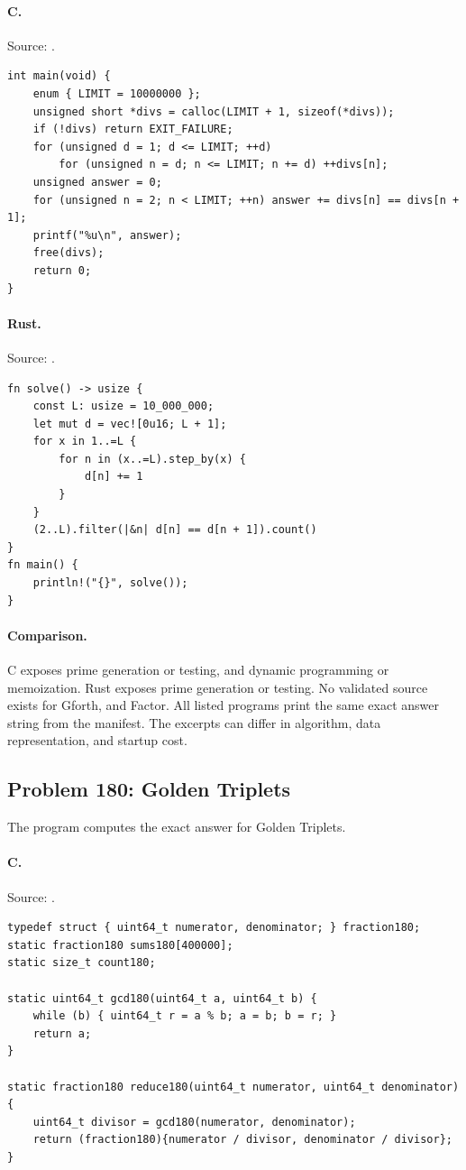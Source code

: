 \paragraph{C.} Source: .
\begin{lstlisting}
int main(void) {
    enum { LIMIT = 10000000 };
    unsigned short *divs = calloc(LIMIT + 1, sizeof(*divs));
    if (!divs) return EXIT_FAILURE;
    for (unsigned d = 1; d <= LIMIT; ++d)
        for (unsigned n = d; n <= LIMIT; n += d) ++divs[n];
    unsigned answer = 0;
    for (unsigned n = 2; n < LIMIT; ++n) answer += divs[n] == divs[n + 1];
    printf("%u\n", answer);
    free(divs);
    return 0;
}
\end{lstlisting}

\paragraph{Rust.} Source: .
\begin{lstlisting}
fn solve() -> usize {
    const L: usize = 10_000_000;
    let mut d = vec![0u16; L + 1];
    for x in 1..=L {
        for n in (x..=L).step_by(x) {
            d[n] += 1
        }
    }
    (2..L).filter(|&n| d[n] == d[n + 1]).count()
}
fn main() {
    println!("{}", solve());
}
\end{lstlisting}

\paragraph{Comparison.}
C exposes prime generation or testing, and dynamic programming or memoization. Rust exposes prime generation or testing.
No validated source exists for Gforth, and Factor.
All listed programs print the same exact answer string from the manifest. The excerpts can differ in algorithm, data representation, and startup cost.

\subsection{Problem 180: Golden Triplets}
\label{walkthrough:p180}
The program computes the exact answer for Golden Triplets.

\paragraph{C.} Source: .
\begin{lstlisting}
typedef struct { uint64_t numerator, denominator; } fraction180;
static fraction180 sums180[400000];
static size_t count180;

static uint64_t gcd180(uint64_t a, uint64_t b) {
    while (b) { uint64_t r = a % b; a = b; b = r; }
    return a;
}

static fraction180 reduce180(uint64_t numerator, uint64_t denominator) {
    uint64_t divisor = gcd180(numerator, denominator);
    return (fraction180){numerator / divisor, denominator / divisor};
}
\end{lstlisting}

